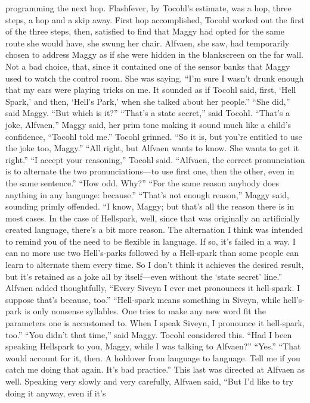 \documentclass[9pt]{article}
\begin{document}
programming the next hop. Flashfever, by Tocohl’s estimate, was a hop, three steps, a hop and a skip
away. First hop accomplished, Tocohl worked out the first of the three steps, then, satisfied to find that
Maggy had opted for the same route she would have, she swung her chair.
Alfvaen, she saw, had temporarily chosen to address Maggy as if she were hidden in the blankscreen on the far wall. Not a bad choice, that, since it contained one of the sensor banks that Maggy
used to watch the control room.
She was saying, “I’m sure I wasn’t drunk enough that my ears were playing tricks on me. It sounded
as if Tocohl said, first, ‘Hell Spark,’ and then, ‘Hell’s Park,’ when she talked about her people.”
“She did,” said Maggy.
“But which is it?”
“That’s a state secret,” said Tocohl.
“That’s a joke, Alfvaen,” Maggy said, her prim tone making it sound much like a child’s confidence,
“Tocohl told me.”
Tocohl grinned. “So it is, but you’re entitled to use the joke too, Maggy.”
“All right, but Alfvaen wants to know. She wants to get it right.”
“I accept your reasoning,” Tocohl said. “Alfvaen, the correct pronunciation is to alternate the two
pronunciations—to use first one, then the other, even in the same sentence.”
“How odd. Why?”
“For the same reason anybody does anything in any language: because.”
“That’s not enough reason,” Maggy said, sounding primly offended.
“I know, Maggy; but that’s all the reason there is in most cases. In the case of Hellspark, well, since
that was originally an artificially created language, there’s a bit more reason. The alternation I think was
intended to remind you of the need to be flexible in language. If so, it’s failed in a way. I can no more use
two Hell’s-parks followed by a Hell-spark than some people can learn to alternate them every time. So I
don’t think it achieves the desired result, but it’s retained as a joke all by itself—even without the ‘state
secret’ line.”
Alfvaen added thoughtfully, “Every Siveyn I ever met pronounces it hell-spark. I suppose that’s
because, too.”
“Hell-spark means something in Siveyn, while hell’s-park is only nonsense syllables. One tries to
make any new word fit the parameters one is accustomed to. When I speak Siveyn, I pronounce it
hell-spark, too.”
“You didn’t that time,” said Maggy.
Tocohl considered this. “Had I been speaking Hellspark to you, Maggy, while I was talking to
Alfvaen?”
“Yes.”
“That would account for it, then. A holdover from language to language. Tell me if you catch me
doing that again. It’s bad practice.” This last was directed at Alfvaen as well.
Speaking very slowly and very carefully, Alfvaen said, “But I’d like to try doing it anyway, even if it’s
\end{document}

